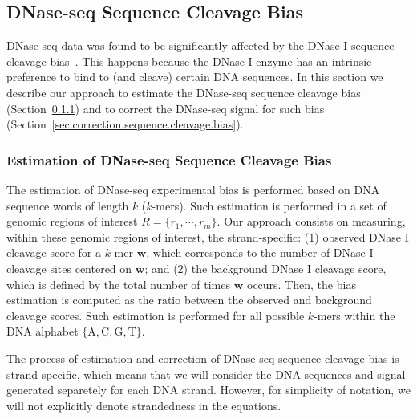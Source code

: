 \subsection{DNase-seq Sequence Cleavage Bias}
\label{sec:dnaseseq.sequence.cleavage.bias}

DNase-seq data was found to be significantly affected by the DNase I sequence cleavage bias~\cite{he2014,meyer2014}. This happens because the DNase I enzyme has an intrinsic preference to bind to (and cleave) certain DNA sequences. In this section we describe our approach to estimate the DNase-seq sequence cleavage bias (Section~\ref{sec:estimation.sequence.cleavage.bias}) and to correct the DNase-seq signal for such bias (Section~\ref{sec:correction.sequence.cleavage.bias}).

\subsubsection{Estimation of DNase-seq Sequence Cleavage Bias}
\label{sec:estimation.sequence.cleavage.bias}

The estimation of DNase-seq experimental bias is performed based on DNA sequence words of length $k$ ($k$-mers). Such estimation is performed in a set of genomic regions of interest $R = \{{r}_{1}, \cdots, {r}_{m}\}$. Our approach consists on measuring, within these genomic regions of interest, the strand-specific: (1) observed DNase I cleavage score for a $k$-mer $\mathbf{w}$, which corresponds to the number of DNase I cleavage sites centered on $\mathbf{w}$; and (2) the background DNase I cleavage score, which is defined by the total number of times $\mathbf{w}$ occurs. Then, the bias estimation is computed as the ratio between the observed and background cleavage scores. Such estimation is performed for all possible $k$-mers within the DNA alphabet $\{\text{A}, \text{C}, \text{G}, \text{T}\}$.

The process of estimation and correction of DNase-seq sequence cleavage bias is strand-specific, which means that we will consider the DNA sequences and signal generated separetely for each DNA strand. However, for simplicity of notation, we will not explicitly denote strandedness in the equations.

